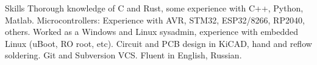 
\begin{rubric}{Skills}
\entry*[]
  Thorough knowledge of C and Rust, some experience with C++, Python, Matlab.
\entry*[]
  Microcontrollers: Experience with AVR, STM32, ESP32/8266, RP2040, others.
\entry*[]
  Worked as a Windows and Linux sysadmin, experience with embedded Linux (uBoot, RO root, etc).
\entry*[]
  Circuit and PCB design in KiCAD, hand and reflow soldering.
\entry*[]
  Git and Subversion VCS.
\entry*[]
  Fluent in English, Russian.
\end{rubric}
